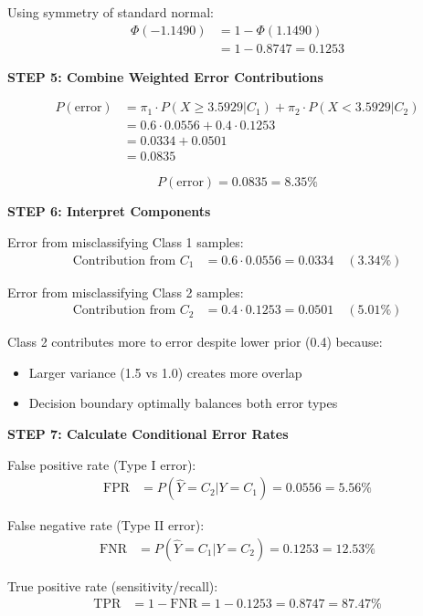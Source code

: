 \documentclass[12pt]{article}
\begin{document}
\begin{solution}
Using symmetry of standard normal:
\begin{align*}
\Phi(-1.1490) &= 1 - \Phi(1.1490) \\
&= 1 - 0.8747 = 0.1253
\end{align*}

\textbf{STEP 5: Combine Weighted Error Contributions}

\begin{align*}
P(\text{error}) &= \pi_1 \cdot P(X \geq 3.5929 | C_1) + \pi_2 \cdot P(X < 3.5929 | C_2) \\
&= 0.6 \cdot 0.0556 + 0.4 \cdot 0.1253 \\
&= 0.0334 + 0.0501 \\
&= 0.0835
\end{align*}

\[\boxed{P(\text{error}) = 0.0835 = 8.35\%}\]

\textbf{STEP 6: Interpret Components}

Error from misclassifying Class 1 samples:
\begin{align*}
\text{Contribution from } C_1 &= 0.6 \cdot 0.0556 = 0.0334 \quad (3.34\%)
\end{align*}

Error from misclassifying Class 2 samples:
\begin{align*}
\text{Contribution from } C_2 &= 0.4 \cdot 0.1253 = 0.0501 \quad (5.01\%)
\end{align*}

Class 2 contributes more to error despite lower prior (0.4) because:
\begin{itemize}
\item Larger variance (1.5 vs 1.0) creates more overlap
\item Decision boundary optimally balances both error types
\end{itemize}

\textbf{STEP 7: Calculate Conditional Error Rates}

False positive rate (Type I error):
\begin{align*}
\text{FPR} &= P(\hat{Y} = C_2 | Y = C_1) = 0.0556 = 5.56\%
\end{align*}

False negative rate (Type II error):
\begin{align*}
\text{FNR} &= P(\hat{Y} = C_1 | Y = C_2) = 0.1253 = 12.53\%
\end{align*}

True positive rate (sensitivity/recall):
\begin{align*}
\text{TPR} &= 1 - \text{FNR} = 1 - 0.1253 = 0.8747 = 87.47\%
\end{align*}


\end{solution}
\end{document}
